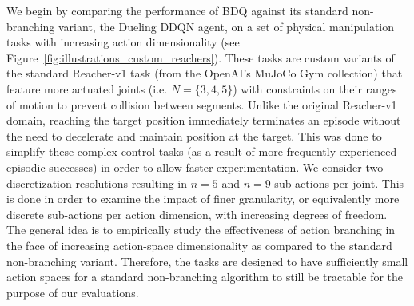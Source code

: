 \documentclass[letterpaper]{article}
\begin{document}
We begin by comparing the performance of BDQ against its standard non-branching variant, the Dueling DDQN agent, on a set of physical manipulation tasks with increasing action dimensionality (see Figure~\ref{fig:illustrations_custom_reachers}). These tasks are custom variants of the standard Reacher-v1 task (from the OpenAI's MuJoCo Gym collection) that feature more actuated joints (i.e. $N = \{3,4,5\}$) with constraints on their ranges of motion to prevent collision between segments. Unlike the original Reacher-v1 domain, reaching the target position immediately terminates an episode without the need to decelerate and maintain position at the target. This was done to simplify these complex control tasks (as a result of more frequently experienced episodic successes) in order to allow faster experimentation. We consider two discretization resolutions resulting in $n=5$ and $n=9$ sub-actions per joint. This is done in order to examine the impact of finer granularity, or equivalently more discrete sub-actions per action dimension, with increasing degrees of freedom. The general idea is to empirically study the effectiveness of action branching in the face of increasing action-space dimensionality as compared to the standard non-branching variant. Therefore, the tasks are designed to have sufficiently small action spaces for a standard non-branching algorithm to still be tractable for the purpose of our evaluations.
\end{document}
